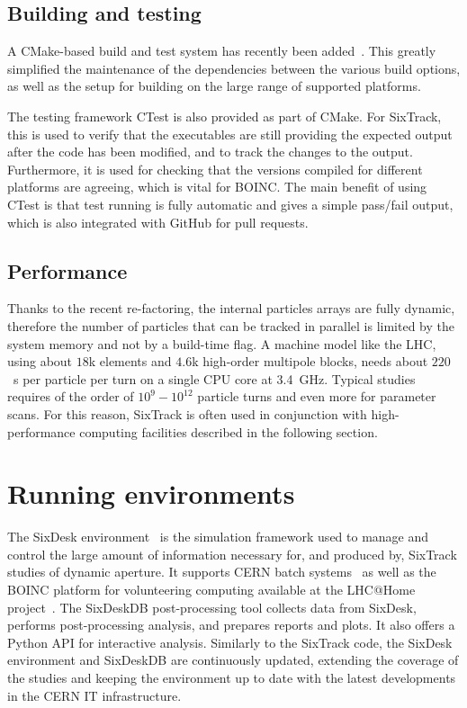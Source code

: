 \documentclass[a4paper,
              ]{jacow}
\begin{document}
\subsection{Building and testing}

A CMake-based build and test system has recently been added~\cite{recentDevels2}. This greatly simplified the maintenance of the dependencies between the various build options, as well as the setup for building on the large range of supported platforms.

The testing framework CTest is also provided as part of CMake. For SixTrack, this is used to verify that the executables are still providing the expected output after the code has been modified, and to track the changes to the output. Furthermore, it is used for checking that the versions compiled for different platforms are agreeing, which is vital for BOINC. The main benefit of using CTest is that test running is fully automatic and gives a simple pass/fail output, which is also integrated with GitHub for pull requests.

\subsection{Performance}

Thanks to the recent re-factoring, the internal particles arrays are fully dynamic, therefore the number of particles that can be tracked in parallel is limited by the system memory and not by a build-time flag. A machine model like the LHC, using about $18$k elements and $4.6$k high-order multipole blocks, needs about $220$~\textmu s per particle per turn on a single CPU core at 3.4~GHz. Typical studies requires of the order of $10^9 - 10^{12}$ particle turns and even more for parameter scans. For this reason, SixTrack is often used in conjunction with high-performance computing facilities described in the following section.

\section{Running environments}

The SixDesk environment~\cite{sixdesk} is the simulation framework used to manage and control the large amount of information necessary for, and produced by, SixTrack studies of dynamic aperture. It supports CERN batch systems~\cite{cernbatch} as well as the BOINC platform for volunteering computing available at the LHC@Home project~\cite{lhcathome}. The SixDeskDB post-processing tool collects data from SixDesk, performs post-processing analysis, and prepares reports and plots. It also offers a Python API for interactive analysis. Similarly to the SixTrack code, the SixDesk environment and SixDeskDB are continuously updated, extending the coverage of the studies and keeping the environment up to date with the latest developments in the CERN IT infrastructure.
\end{document}
